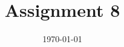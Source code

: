 \documentclass[a4paper]{article}
\date{\today}
\title{Assignment 8}
\newcommand{\T}{\top}
\newcommand{\expdist}[2]{%
        \normalfont{\textsc{Exp}}(#1, #2)%
    }
\newcommand{\expparam}{\bm \lambda}
\newcommand{\natparam}{\bm \eta}
\newcommand{\sufstat}{\bm u}
\begin{document}
    \header{}



\end{document}
